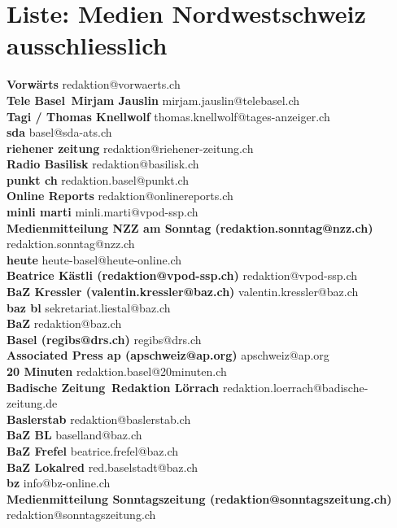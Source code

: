\documentclass{scrartcl}
\begin{document}
\section*{Liste: Medien Nordwestschweiz ausschliesslich}
\textbf{Vorwärts } redaktion@vorwaerts.ch\\
\textbf{Tele Basel\, Mirjam Jauslin } mirjam.jauslin@telebasel.ch\\
\textbf{Tagi / Thomas Knellwolf } thomas.knellwolf@tages-anzeiger.ch\\
\textbf{sda } basel@sda-ats.ch\\
\textbf{riehener zeitung } redaktion@riehener-zeitung.ch\\
\textbf{Radio Basilisk } redaktion@basilisk.ch\\
\textbf{punkt ch } redaktion.basel@punkt.ch\\
\textbf{Online Reports } redaktion@onlinereports.ch\\
\textbf{minli marti } minli.marti@vpod-ssp.ch\\
\textbf{Medienmitteilung NZZ am Sonntag (redaktion.sonntag@nzz.ch)\n	 } redaktion.sonntag@nzz.ch\\
\textbf{heute } heute-basel@heute-online.ch\\
\textbf{Beatrice Kästli  (redaktion@vpod-ssp.ch)\n	 } redaktion@vpod-ssp.ch\\
\textbf{BaZ Kressler (valentin.kressler@baz.ch) } valentin.kressler@baz.ch\\
\textbf{baz bl } sekretariat.liestal@baz.ch\\
\textbf{BaZ } redaktion@baz.ch\\
\textbf{Basel (regibs@drs.ch) } regibs@drs.ch\\
\textbf{Associated Press ap (apschweiz@ap.org) } apschweiz@ap.org\\
\textbf{20 Minuten } redaktion.basel@20minuten.ch\\
\textbf{Badische Zeitung\, Redaktion  Lörrach\n	 } redaktion.loerrach@badische-zeitung.de\\
\textbf{Baslerstab } redaktion@baslerstab.ch\\
\textbf{BaZ BL } baselland@baz.ch\\
\textbf{BaZ Frefel } beatrice.frefel@baz.ch\\
\textbf{BaZ Lokalred } red.baselstadt@baz.ch\\
\textbf{bz } info@bz-online.ch\\
\textbf{Medienmitteilung Sonntagszeitung (redaktion@sonntagszeitung.ch)\n	 } redaktion@sonntagszeitung.ch\\
\end{document}
